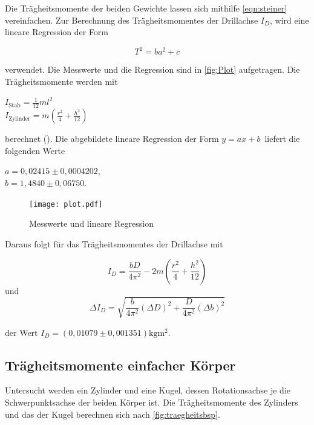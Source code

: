 Die Trägheitsmomente der beiden Gewichte lassen sich mithilfe \autoref{eqn:steiner} vereinfachen. Zur Berechnung
des Trägheitsmomentes der Drillachse $I_D$, wird eine lineare Regression der Form

\begin{equation}
  \label{eqn:linReg}
  T^2 = ba^2+c
\end{equation}


verwendet.
Die Messwerte und die Regression sind in \autoref{fig:Plot} aufgetragen. Die Trägheitsmomente werden mit
\begin{center}
  $I_{\text{Stab}} = \frac{1}{12} ml^2 $ \\
  $I_{\text{Zylinder}} = m (\frac{r^2}{4} +\frac{h^2}{12}) $ \\
\end{center}
berechnet (\cite{Anleitung}).
Die abgebildete lineare Regression der Form $ y = ax + b \,$ liefert die folgenden Werte

\begin{center}
  $ a = 0,02415 \pm 0,0004202 $, \\
  $ b = 1,4840 \pm 0,06750 $. \\
\end{center}

\begin{figure}[H]
  \centering
  \texttt{[image: plot.pdf]}
  \caption{Messwerte und lineare Regression}
  \label{fig:Plot}
\end{figure}


Daraus folgt für das Trägheitsmomentes der Drillachse mit

\begin{equation*}
  I_D = \frac{bD}{4 \pi ^2} - 2m (\frac{r^2}{4} + \frac{h^2}{12})
\end{equation*}
und
\begin{equation*}
  \Delta I_D = \sqrt{\frac{b}{4 \pi ^2}  (\Delta D)^2 + \frac{D}{4 \pi ^2}  (\Delta b)^2}
\end{equation*}

der Wert $I_D = (0,01079 \pm 0,001351) \si{\kilogram\meter^2} $.

\subsection{Trägheitsmomente einfacher Körper}
\label{sec:Trägheitsmomente einfacher Körper}

Untersucht werden ein Zylinder und eine Kugel, dessen Rotationsachse je die Schwerpunktsachse der beiden Körper ist.
Die Trägheitsmomente des Zylinders und das der Kugel berechnen sich nach \autoref{fig:traegheitsbsp}.

